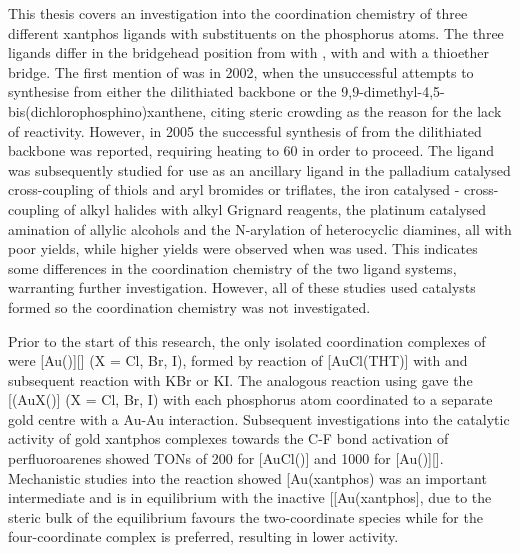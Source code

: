 This thesis covers an investigation into the coordination chemistry of three different xantphos ligands with \tBu{} substituents on the phosphorus atoms.  The three ligands differ in the bridgehead position from \tBuxantphos{} with , \tBusixantphos{} with  and \tButhixantphos{} with a thioether bridge.  The first mention of \tBuxantphos{} was in 2002, when the unsuccessful attempts to synthesise \tBuxantphos{} from either the dilithiated backbone or the 9,9-dimethyl-4,5-bis(dichlorophosphino)xanthene, citing steric crowding as the reason for the lack of reactivity.\cite{Zuideveld2002}  However, in 2005 the successful synthesis of \tBuxantphos{} from the dilithiated backbone was reported, requiring heating to 60\degC{} in order to proceed.\cite{Mispelaere2005}  The ligand was subsequently studied for use as an ancillary ligand in the palladium catalysed cross-coupling of thiols and aryl bromides or triflates, the iron catalysed - cross-coupling of alkyl halides with alkyl Grignard reagents, the platinum catalysed amination of allylic alcohols and the N-arylation of heterocyclic diamines, all with poor yields, while higher yields were observed when \Phxantphos{} was used.\cite{Mispelaere2005, Dongol2007, Ohshima2009, Cabello2007}  This indicates some differences in the coordination chemistry of the two ligand systems, warranting further investigation.  However, all of these studies used catalysts formed  so the coordination chemistry was not investigated.

Prior to the start of this research, the only isolated coordination complexes of \tBuxantphos{} were [Au(\tBuxantphos)][] (X = Cl, Br, I), formed by reaction of [AuCl(THT)] with \tBuxantphos{} and subsequent reaction with KBr or KI.\cite{Partyka2010}  The analogous reaction using \Phxantphos{} gave the [(AuX(\Phxantphos)] (X = Cl, Br, I) with each phosphorus atom coordinated to a separate gold centre with a Au-Au interaction.\cite{Pintado2004, Partyka2010}  Subsequent investigations into the catalytic activity of gold xantphos complexes towards the C-F bond activation of perfluoroarenes showed \glspl{TON} of 200 for [AuCl(\Phxantphos)] and 1000 for [Au(\tBuxantphos)][].\cite{Zhan2012}  Mechanistic studies into the reaction showed [Au(xantphos)\ce{]+} was an important intermediate and is in equilibrium with the inactive [[Au(xantphos], due to the steric bulk of \tBuxantphos{} the equilibrium favours the two-coordinate species while for \Phxantphos{} the four-coordinate complex is preferred, resulting in lower activity.  

